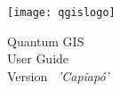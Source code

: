 
\begin{titlepage}
\begin{center}

\begin{center}
\texttt{[image: qgislogo]} 
\end{center}

\Huge{Quantum GIS}\\
\vspace{0.5cm}
\Large{User Guide} \\
\vspace{0.5cm}
\Large{Version ~\CURRENT \textsl{'Capiapó'}}

\end{center}
\end{titlepage}
